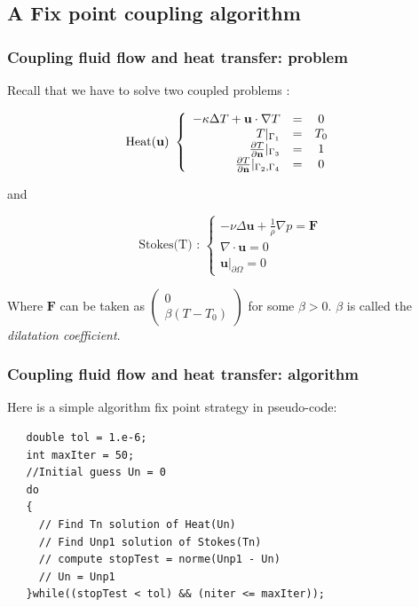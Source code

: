\subsection{A Fix point coupling algorithm}
\label{sec:coupling-algorithm}

\subsubsection{Coupling fluid flow and heat transfer: problem}
  Recall that we have to solve two coupled problems :

  $$
  \mbox{Heat(\textbf{u}) }\left\{
  \begin{array}{rcc}
    - \kappa\Delta T + \mathbf{u}\cdot\nabla T &=& 0 \\
    T|_{\Gamma_1} &=& T_0 \\
    \frac{\partial T}{\partial \mathbf{n}}|_{\Gamma_3} &=&1 \\
    \frac{\partial T}{\partial \mathbf{n}}|_{\Gamma_2,\Gamma_4} &=& 0
  \end{array}
  \right.
  $$

  and

  $$\mbox{Stokes(T) : }\left\{
    \begin{array}{rcc}
      -\nu\Delta\mathbf{u} +
      \frac{1}{\rho}\nabla p =
      \mathbf{F}\\
      \nabla\cdot\mathbf{u} = 0\\
      \mathbf{u}|_{\partial \Omega} = 0
    \end{array}
  \right.
  $$

Where $\mathbf{F}$ can be taken as $
 \left(
  \begin{array}{c}
    0 \\
    \beta(T-T_0)
  \end{array}
\right)
$
for some $\beta > 0$. $\beta$ is called the \emph{dilatation coefficient}.

\subsubsection{Coupling fluid flow and heat transfer: algorithm}
Here is a simple algorithm fix point strategy in pseudo-code:
\begin{lstlisting}
   double tol = 1.e-6;
   int maxIter = 50;
   //Initial guess Un = 0
   do
   {
     // Find Tn solution of Heat(Un)
     // Find Unp1 solution of Stokes(Tn)
     // compute stopTest = norme(Unp1 - Un)
     // Un = Unp1
   }while((stopTest < tol) && (niter <= maxIter));
\end{lstlisting}

